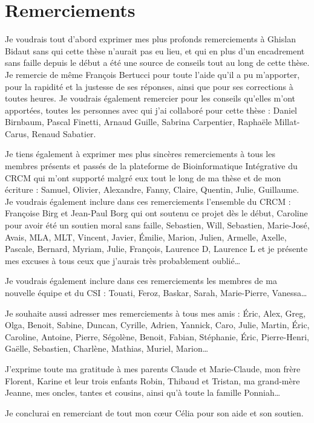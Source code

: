 \chapter*{Remerciements}

\noindent{}Je voudrais tout d'abord exprimer mes plus profonds remerciements à Ghislan Bidaut sans qui cette thèse n'aurait pas eu lieu, et qui en plus d'un encadrement sans faille depuis le début a été une source de conseils tout au long de cette thèse. Je remercie de même François Bertucci pour toute l'aide qu'il a pu m'apporter, pour la rapidité et la justesse de ses réponses, ainsi que pour ses corrections à toutes heures. Je voudrais également remercier pour les conseils qu'elles m'ont apportées, toutes les personnes avec qui j'ai collaboré pour cette thèse : Daniel Birnbaum, Pascal Finetti, Arnaud Guille, Sabrina Carpentier, Raphaële Millat-Carus, Renaud Sabatier.
\vspace{.5cm}

\noindent{}Je tiens également à exprimer mes plus sincères remerciements à tous les membres présents et passés de la plateforme de Bioinformatique Intégrative du CRCM qui m'ont supporté malgré eux tout le long de ma thèse et de mon écriture : Samuel, Olivier, Alexandre, Fanny, Claire, Quentin, Julie, Guillaume. Je voudrais également inclure dans ces remerciements l'ensemble du CRCM : Françoise Birg et Jean-Paul Borg qui ont soutenu ce projet dès le début, Caroline pour avoir été un soutien moral sans faille, Sebastien, Will, Sebastien, Marie-José, Avais, MLA, MLT, Vincent, Javier, Émilie, Marion, Julien, Armelle, Axelle, Pascale, Bernard, Myriam, Julie, François, Laurence D, Laurence L et je présente mes excuses à tous ceux que j'aurais très probablement oublié\dots
\vspace{.5cm}

\noindent{}Je voudrais également inclure dans ces remerciements les membres de ma nouvelle équipe et du \acs{CSI} : Touati, Feroz, Baskar, Sarah, Marie-Pierre, Vanessa\dots
\vspace{.5cm}

\noindent{}Je souhaite aussi adresser mes remerciements à tous mes amis : Éric, Alex, Greg, Olga, Benoit, Sabine, Duncan, Cyrille, Adrien, Yannick, Caro, Julie, Martin, Éric, Caroline, Antoine, Pierre, Ségolène, Benoit, Fabian, Stéphanie, Éric, Pierre-Henri, Gaëlle, Sebastien, Charlène, Mathias, Muriel, Marion\dots
\vspace{.5cm}

\noindent{}J'exprime toute ma gratitude à mes parents Claude et Marie-Claude, mon frère Florent, Karine et leur trois enfants Robin, Thibaud et Tristan, ma grand-mère Jeanne, mes oncles, tantes et cousins, ainsi qu'à toute la famille Ponniah\dots
\vspace{.5cm}

\noindent{}Je conclurai en remerciant de tout mon c{\oe}ur Célia pour son aide et son soutien.